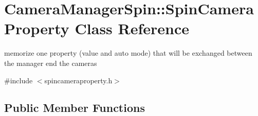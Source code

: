 \hypertarget{class_camera_manager_spin_1_1_spin_camera_property}{}\section{Camera\+Manager\+Spin\+::Spin\+Camera\+Property Class Reference}
\label{class_camera_manager_spin_1_1_spin_camera_property}


memorize one property (value and auto mode) that will be exchanged between the manager end the cameras  




{\ttfamily \#include $<$spincameraproperty.\+h$>$}

\subsection*{Public Member Functions}
